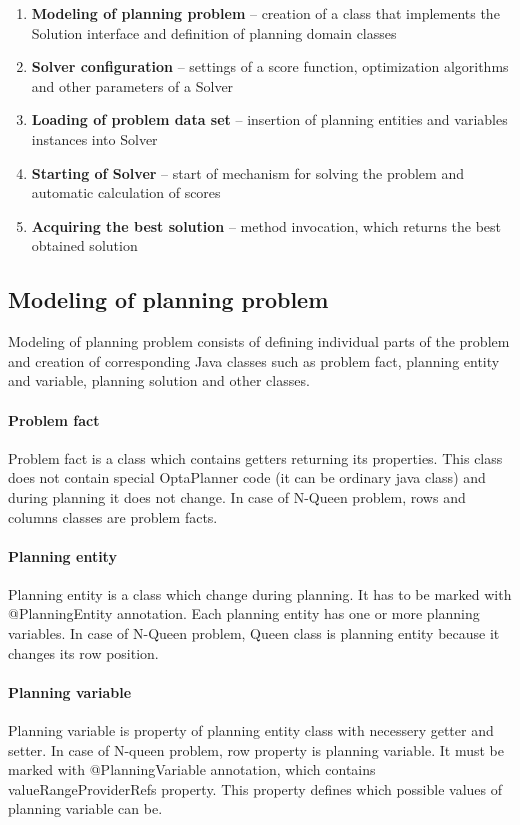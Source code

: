 \begin{enumerate}
\item \textbf{Modeling of planning problem} -- creation of a class that implements the Solution interface and definition of planning domain classes
\item \textbf{Solver configuration} -- settings of a score function, optimization algorithms and other parameters of a Solver
\item \textbf{Loading of problem data set} -- insertion of planning entities and variables instances into Solver
\item \textbf{Starting of Solver} -- start of mechanism for solving the problem and automatic calculation of scores
\item \textbf{Acquiring the best solution} -- method invocation, which returns the best obtained solution
\end{enumerate}

\subsection{Modeling of planning problem}
Modeling of planning problem consists of defining individual parts of the problem and creation of corresponding Java classes such as problem fact, planning entity and variable, planning solution and other classes.

\paragraph{Problem fact}
Problem fact is a class which contains getters returning its properties. This class does not contain special OptaPlanner code (it can be ordinary java class) and during planning it does not change. In case of N-Queen problem, rows and columns classes are problem facts.

\paragraph{Planning entity}
Planning entity is a class which change during planning. It has to be marked with @PlanningEntity annotation. Each planning entity has one or more planning variables. In case of N-Queen problem, Queen class is planning entity because it changes its row position.

\paragraph{Planning variable}
Planning variable is property of planning entity class with necessery getter and setter. In case of N-queen problem, row property is planning variable. It must be marked with @PlanningVariable annotation, which contains valueRangeProviderRefs property. This property defines which possible values of planning variable can be.


